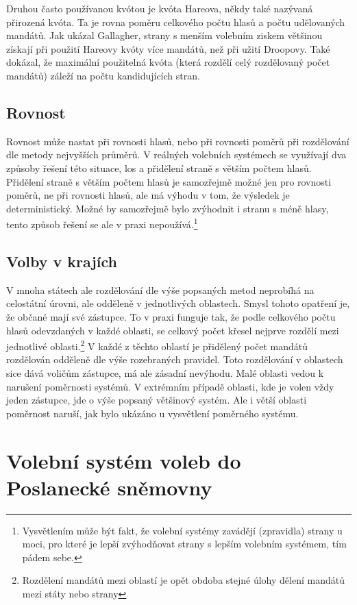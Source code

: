\documentclass[12pt]{report}
\begin{document}
Druhou často používanou kvótou je kvóta Hareova, někdy také nazývaná přirozená kvóta.
Ta je rovna poměru celkového počtu hlasů a počtu udělovaných mandátů.
Jak ukázal Gallagher, strany s menším volebním ziskem většinou získají při použití Hareovy kvóty více mandátů, než při užití Droopovy.
Také dokázal, že maximální použitelná kvóta (která rozdělí celý rozdělovaný počet mandátů) záleží na počtu kandidujících stran.\autocite{GAL1}
\section{Rovnost}
Rovnost může nastat při rovnosti hlasů, nebo při rovnosti poměrů při rozdělování dle metody nejvyšších průměrů.
V reálných volebních systémech se využívají dva způsoby řešení této situace, los a přidělení straně s větším počtem hlasů.
Přidělení straně s větším počtem hlasů je samozřejmě možné jen pro rovnosti poměrů, ne při rovnosti hlasů, ale má výhodu v tom, že výsledek je deterministický.
Možné by samozřejmě bylo zvýhodnit i stranu s méně hlasy, tento způsob řešení se ale v praxi nepoužívá.\footnote{Vysvětlením může být fakt, že volební systémy zavádějí (zpravidla) strany u moci, pro které je lepší zvýhodňovat strany s lepším volebním systémem, tím pádem sebe.}
\section{Volby v krajích}
V mnoha státech ale rozdělování dle výše popsaných metod neprobíhá na celostátní úrovni, ale odděleně v jednotlivých oblastech.
Smysl tohoto opatření je, že občané mají své  zástupce.
To v praxi funguje tak, že podle celkového počtu hlasů odevzdaných v každé oblasti, se celkový počet křesel nejprve rozdělí mezi jednotlivé oblasti.\footnote{Rozdělení mandátů mezi oblastí je opět obdoba stejné úlohy dělení mandátů mezi státy nebo strany}
V každé z těchto oblastí je přidělený počet mandátů rozdělován odděleně dle výše rozebraných pravidel.
Toto rozdělování v oblastech sice dává voličům  zástupce, má ale zásadní nevýhodu.
Malé oblasti vedou k narušení poměrnosti systémů.
V extrémním případě oblasti, kde je volen vždy jeden zástupce, jde o výše popsaný většinový systém.
Ale i větší oblasti poměrnost naruší, jak bylo ukázáno u vysvětlení poměrného systému.
\chapter{Volební systém voleb do Poslanecké sněmovny} 
\end{document}
